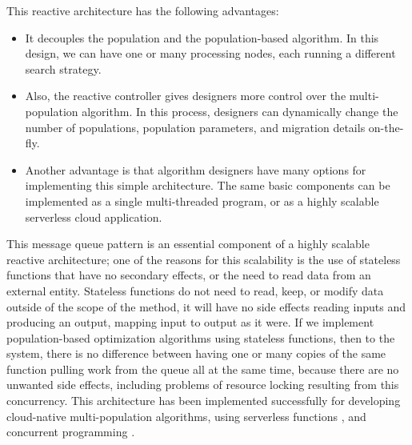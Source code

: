 \documentclass[runningheads]{llncs}
\begin{document}
This reactive architecture has the following advantages:
\begin{itemize}

\item It decouples the population and the population-based algorithm. In this
design, we can have one or many processing nodes, each running a different
search strategy.

\item Also, the reactive controller gives designers more control over the
multi-population algorithm. In this process, designers can dynamically change
the number of populations, population parameters, and migration details
on-the-fly.

\item Another advantage is that algorithm designers have many options for
implementing this simple architecture. The same basic components can be
implemented as a single multi-threaded program, or as a highly scalable
serverless cloud application.
\end{itemize}


This message queue pattern is an essential component of a highly
scalable reactive architecture; one of the reasons for this
scalability is the use of stateless functions that have no secondary
effects, or the need to read data from an external entity. Stateless
functions do not need to read, keep, or modify data outside of the
scope of the method, it will have no side effects reading inputs and
producing an output, mapping input to output as it were. If we
implement population-based optimization algorithms using stateless
functions, then to the system, there is no difference between having
one or many copies of the same function pulling work from the queue
all at the same time, because there are no unwanted side effects,
including problems of resource locking resulting from this
concurrency. This architecture has been implemented successfully for
developing cloud-native multi-population algorithms, using serverless
functions \cite{garcia2018modern}, and concurrent programming
\cite{guervos2019improving}. %
\end{document}
